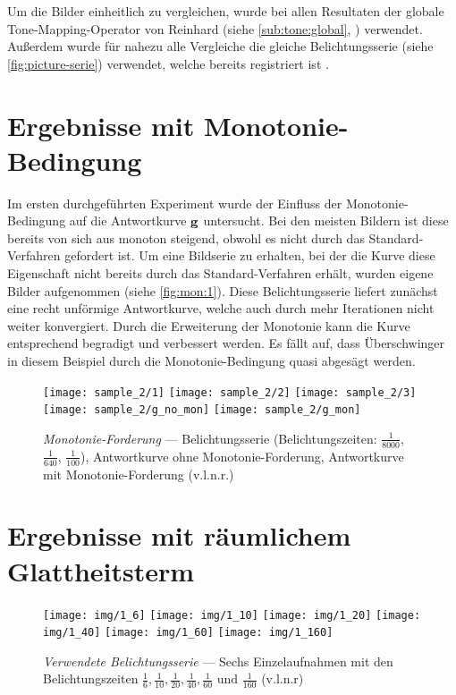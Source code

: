 Um die Bilder einheitlich zu vergleichen, wurde bei allen Resultaten der globale \gls{Tone-Mapping}-Operator von Reinhard (siehe \autoref{sub:tone:global}, \cite{ReinhardToneMapper}) verwendet. Außerdem wurde für nahezu alle Vergleiche die gleiche Belichtungsserie (siehe \autoref{fig:picture-serie}) verwendet, welche bereits registriert ist \cite{tellone}.



\section{Ergebnisse mit Monotonie-Bedingung}
Im ersten durchgeführten Experiment wurde der Einfluss der Monotonie-Bedingung auf die Antwortkurve $\mathbf g$ untersucht.
Bei den meisten Bildern ist diese bereits von sich aus monoton steigend, obwohl es nicht durch das Standard-Verfahren gefordert ist. Um eine Bildserie zu erhalten, bei der die Kurve diese Eigenschaft nicht bereits durch das Standard-Verfahren erhält, wurden eigene Bilder aufgenommen (siehe \autoref{fig:mon:1}). Diese Belichtungsserie liefert zunächst eine recht unförmige Antwortkurve, welche auch durch mehr Iterationen nicht weiter konvergiert. Durch die Erweiterung der Monotonie kann die Kurve entsprechend begradigt und verbessert werden. Es fällt auf, dass Überschwinger in diesem Beispiel durch die Monotonie-Bedingung quasi abgesägt werden. 

\begin{figure}
  \begin{center}
    \texttt{[image: sample\_2/1]}
    \texttt{[image: sample\_2/2]}
    \texttt{[image: sample\_2/3]}
     \hfill
    \texttt{[image: sample\_2/g\_no\_mon]}
    \texttt{[image: sample\_2/g\_mon]}
    \caption{\textit{Monotonie-Forderung} --- Belichtungsserie (Belichtungszeiten: $\frac{1}{8000}$, $\frac{1}{640}$, $\frac{1}{100}$),  Antwortkurve ohne Monotonie-Forderung, Antwortkurve mit Monotonie-Forderung  (v.l.n.r.)}
    \label{fig:mon:1}
  \end{center}
\end{figure}



\section{Ergebnisse mit räumlichem Glattheitsterm}

\begin{figure}[b]
  \begin{center}
    \texttt{[image: img/1\_6]}
    \texttt{[image: img/1\_10]}
    \texttt{[image: img/1\_20]}
    \texttt{[image: img/1\_40]}
    \texttt{[image: img/1\_60]}
    \texttt{[image: img/1\_160]}
    \caption{\textit{Verwendete Belichtungsserie} --- Sechs Einzelaufnahmen mit den Belichtungszeiten $\frac{1}{6}, \frac{1}{10}, \frac{1}{20}, \frac{1}{40}, \frac{1}{60}\mbox{ und }\frac{1}{160}$ (v.l.n.r) \cite{tellone}}
    \label{fig:picture-serie}
  \end{center}
\end{figure}

